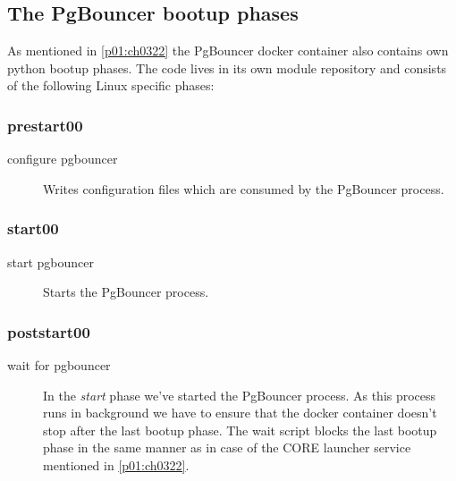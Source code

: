 		\subsection{The PgBouncer bootup phases}
		As mentioned in \ref{p01:ch0322} the PgBouncer docker container also contains own python bootup phases. The code lives in its own module repository and consists of the following Linux specific phases:
			
			\subsubsection{prestart00}
			\begin{description}
				\item[configure pgbouncer] Writes configuration files which are consumed by the PgBouncer process.
			\end{description}
			\subsubsection{start00}
			\begin{description}
				\item[start pgbouncer] Starts the PgBouncer process.
			\end{description}
			\subsubsection{poststart00}
			\begin{description}
				\item[wait for pgbouncer]  In the \emph{start} phase we've started the PgBouncer process. As this process runs in background we have to ensure that the docker container doesn't stop after the last bootup phase. The wait script blocks the last bootup phase in the same manner as in case of the CORE launcher service mentioned in \ref{p01:ch0322}.
			\end{description}
